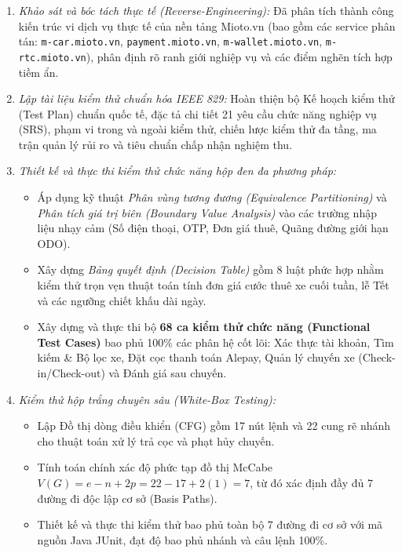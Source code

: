 \documentclass[12pt,a4paper,oneside]{report}
\begin{document}
\begin{enumerate}
  \item \textit{Khảo sát và bóc tách thực tế (Reverse-Engineering):} Đã phân tích thành công kiến trúc vi dịch vụ thực tế của nền tảng Mioto.vn (bao gồm các service phân tán: \texttt{m-car.mioto.vn}, \texttt{payment.mioto.vn}, \texttt{m-wallet.mioto.vn}, \texttt{m-rtc.mioto.vn}), phân định rõ ranh giới nghiệp vụ và các điểm nghẽn tích hợp tiềm ẩn.
  \item \textit{Lập tài liệu kiểm thử chuẩn hóa IEEE 829:} Hoàn thiện bộ Kế hoạch kiểm thử (Test Plan) chuẩn quốc tế, đặc tả chi tiết 21 yêu cầu chức năng nghiệp vụ (SRS), phạm vi trong và ngoài kiểm thử, chiến lược kiểm thử đa tầng, ma trận quản lý rủi ro và tiêu chuẩn chấp nhận nghiệm thu.
  \item \textit{Thiết kế và thực thi kiểm thử chức năng hộp đen đa phương pháp:} 
    \begin{itemize}
      \item Áp dụng kỹ thuật \textit{Phân vùng tương đương (Equivalence Partitioning)} và \textit{Phân tích giá trị biên (Boundary Value Analysis)} vào các trường nhập liệu nhạy cảm (Số điện thoại, OTP, Đơn giá thuê, Quãng đường giới hạn ODO).
      \item Xây dựng \textit{Bảng quyết định (Decision Table)} gồm 8 luật phức hợp nhằm kiểm thử trọn vẹn thuật toán tính đơn giá cước thuê xe cuối tuần, lễ Tết và các ngưỡng chiết khấu dài ngày.
      \item Xây dựng và thực thi bộ \textbf{68 ca kiểm thử chức năng (Functional Test Cases)} bao phủ 100\% các phân hệ cốt lõi: Xác thực tài khoản, Tìm kiếm \& Bộ lọc xe, Đặt cọc thanh toán Alepay, Quản lý chuyến xe (Check-in/Check-out) và Đánh giá sau chuyến.
    \end{itemize}
  \item \textit{Kiểm thử hộp trắng chuyên sâu (White-Box Testing):}
    \begin{itemize}
      \item Lập Đồ thị dòng điều khiển (CFG) gồm 17 nút lệnh và 22 cung rẽ nhánh cho thuật toán xử lý trả cọc và phạt hủy chuyến.
      \item Tính toán chính xác độ phức tạp đồ thị McCabe $V(G) = e - n + 2p = 22 - 17 + 2(1) = 7$, từ đó xác định đầy đủ 7 đường đi độc lập cơ sở (Basis Paths).
      \item Thiết kế và thực thi kiểm thử bao phủ toàn bộ 7 đường đi cơ sở với mã nguồn Java JUnit, đạt độ bao phủ nhánh và câu lệnh 100\%.
    \end{itemize}

\end{enumerate}
\end{document}

